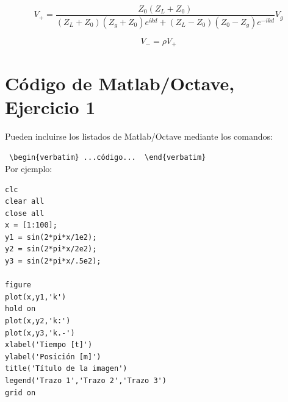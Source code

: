 \documentclass{article}
\begin{document}
\[
 V_+ = \frac{ Z_0 (Z_L+Z_0) }
{(Z_L + Z_0)(Z_g+Z_0) e^{i k d} + (Z_L - Z_0)(Z_0-Z_g)e^{-i k d} } V_g
\]

\[
 V_-=\rho V_+
\]



\appendix

\section{Código de Matlab/Octave, Ejercicio 1}
\label{matlab_ej1}

Pueden incluirse los listados de Matlab/Octave mediante los comandos:

\verb| \begin{verbatim} ...código...  \end{verbatim} |\\
 
Por ejemplo:

\begin{verbatim}
clc
clear all
close all
x = [1:100];
y1 = sin(2*pi*x/1e2);
y2 = sin(2*pi*x/2e2);
y3 = sin(2*pi*x/.5e2);

figure
plot(x,y1,'k')
hold on
plot(x,y2,'k:')
plot(x,y3,'k.-')
xlabel('Tiempo [t]')
ylabel('Posición [m]')
title('Título de la imagen')
legend('Trazo 1','Trazo 2','Trazo 3')
grid on
\end{verbatim}
\end{document}
